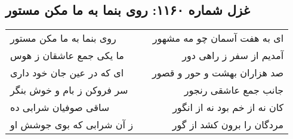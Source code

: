 \begin{center}
\section*{غزل شماره ۱۱۶۰: روی بنما به ما مکن مستور}
\label{sec:1160}
\begin{longtable}{l p{0.5cm} r}
روی بنما به ما مکن مستور
&&
ای به هفت آسمان چو مه مشهور
\\
ما یکی جمع عاشقان ز هوس
&&
آمدیم از سفر ز راهی دور
\\
ای که در عین جان خود داری
&&
صد هزاران بهشت و حور و قصور
\\
سر فروکن ز بام و خوش بنگر
&&
جانب جمع عاشقی رنجور
\\
ساقی صوفیان شرابی ده
&&
کان نه از خم بود نه از انگور
\\
ز آن شرابی که بوی جوشش او
&&
مردگان را برون کشد از گور
\\
\end{longtable}
\end{center}
